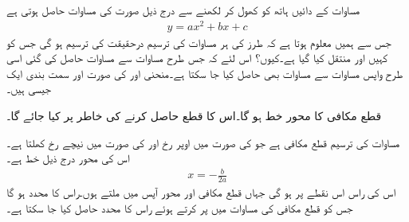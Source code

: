 مساوات  کے دائیں ہاتھ کو کھول کر لکھنے سے درج ذیل صورت کی مساوات حاصل ہوتی ہے
\begin{align}\label{مساوات_ابتدا_دو_درجی_ب}
y=ax^2+bx+c
\end{align}
جس سے ہمیں معلوم ہوتا ہے کہ  طرز کی ہر مساوات کی ترسیم  درحقیقت  کی ترسیم ہو گی جس کو کہیں اور منتقل کیا گیا ہے۔کیوں؟ اس لئے کہ جس طرح مساوات  سے مساوات  حاصل کی گئی اسی طرح واپس مساوات  سے مساوات  بھی حاصل کیا جا سکتا ہے۔منحنی  اور  کی صورت اور سمت بندی ایک جیسی ہیں۔

قطع مکافی  کا محور خط  ہو گا۔اس کا قطع  حاصل کرنے کی خاطر  پر کیا جائے گا۔

\quad 
مساوات  کی ترسیم قطع مکافی ہے جو  کی صورت میں اوپر رخ اور  کی صورت میں نیچے رخ کھلتا ہے۔اس کی محور درج ذیل خط ہے۔
\begin{align}
x=-\frac{b}{2a}
\end{align} 
اس کی راس اس نقطے پر ہو گی جہاں قطع مکافی اور محور آپس میں ملتے ہوں۔راس کا  محدد  ہو گا جس کو قطع مکافی کی مساوات میں پر کرتے ہوئے راس کا  محدد حاصل کیا جا سکتا ہے۔

